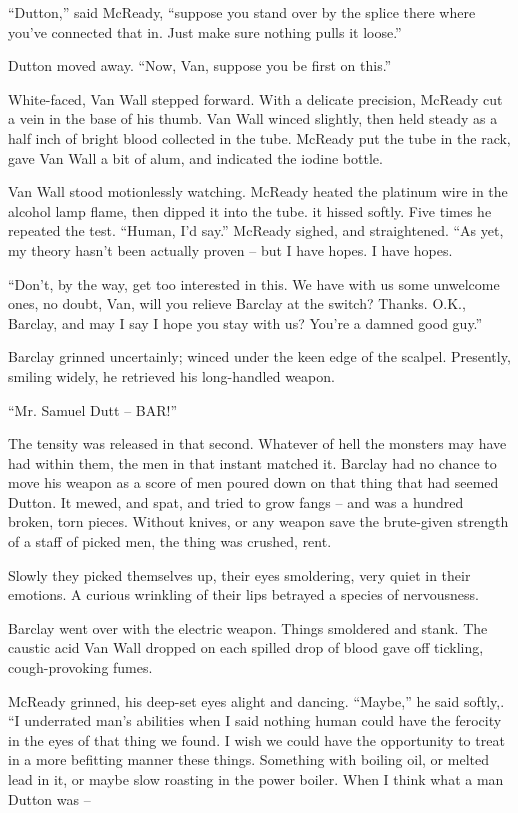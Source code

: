\documentclass[ebook,oneside,11pt]{memoir}				%
\begin{document}
``Dutton,'' said McReady, ``suppose you stand over by the splice there where you've connected that in. Just make sure nothing pulls it loose.''

Dutton moved away. ``Now, Van, suppose you be first on this.''

White-faced, Van Wall stepped forward. With a delicate precision, McReady cut a vein in the base of his thumb. Van Wall winced slightly, then held steady as a half inch of bright blood collected in the tube. McReady put the tube in the rack, gave Van Wall a bit of alum, and indicated the iodine bottle.

Van Wall stood motionlessly watching. McReady heated the platinum wire in the alcohol lamp flame, then dipped it into the tube. it hissed softly. Five times he repeated the test. ``Human, I'd say.'' McReady sighed, and straightened. ``As yet, my theory hasn't been actually proven -- but I have hopes. I have hopes.

``Don't, by the way, get too interested in this. We have with us some unwelcome ones, no doubt, Van, will you relieve Barclay at the switch? Thanks. O.K., Barclay, and may I say I hope you stay with us? You're a damned good guy.''

Barclay grinned uncertainly; winced under the keen edge of the scalpel. Presently, smiling widely, he retrieved his long-handled weapon.

``Mr. Samuel Dutt -- BAR!''

The tensity was released in that second. Whatever of hell the monsters may have had within them, the men in that instant matched it. Barclay had no chance to move his weapon as a score of men poured down on that thing that had seemed Dutton. It mewed, and spat, and tried to grow fangs -- and was a hundred broken, torn pieces. Without knives, or any weapon save the brute-given strength of a staff of picked men, the thing was crushed, rent.

Slowly they picked themselves up, their eyes smoldering, very quiet in their emotions. A curious wrinkling of their lips betrayed a species of nervousness.

Barclay went over with the electric weapon. Things smoldered and stank. The caustic acid Van Wall dropped on each spilled drop of blood gave off tickling, cough-provoking fumes.

McReady grinned, his deep-set eyes alight and dancing. ``Maybe,'' he said softly,. ``I underrated man's abilities when I said nothing human could have the ferocity in the eyes of that thing we found. I wish we could have the opportunity to treat in a more befitting manner these things. Something with boiling oil, or melted lead in it, or maybe slow roasting in the power boiler. When I think what a man Dutton was --
\end{document}
